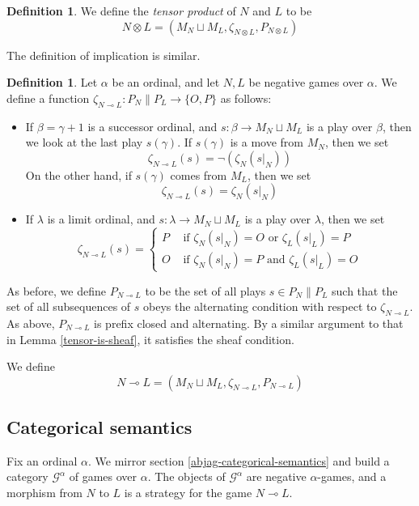 \documentclass[11pt]{article} %
\theoremstyle{plain} %
\theoremstyle{definition} %
\newtheorem{definition}[theorem]{Definition}
\theoremstyle{exercisestyle}
\newcommand*\from{\colon}
\newcommand{\cmap}[3]{#1\from{}#2\to{}#3}
\newcommand{\tensor}{\otimes}
\renewcommand{\implies}{\multimap}
\newcommand{\cprd}{\sqcup}
\newcommand{\G}{\mathcal G}
\begin{document}
\begin{definition}
  We define the \emph{tensor product} of $N$ and $L$ to be
  \[
    N\tensor L=(M_N\cprd M_L,\zeta_{N\tensor L},P_{N\tensor L})
  \]
\end{definition}

The definition of implication is similar.

\begin{definition}
  Let $\alpha$ be an ordinal, and let $N,L$ be negative games over $\alpha$.  We define a function $\cmap{\zeta_{N\implies L}}{P_N\|P_L}{\{O,P\}}$ as follows:
  \begin{itemize}
    \item If $\beta=\gamma+1$ is a successor ordinal, and $\cmap{s}{\beta}{M_N\cprd M_L}$ is a play over $\beta$, then we look at the last play $s(\gamma)$.  If $s(\gamma)$ is a move from $M_N$, then we set
      \[
        \zeta_{N\implies L}(s)=\neg(\zeta_N(s\vert_N))
      \]
      On the other hand, if $s(\gamma)$ comes from $M_L$, then we set
      \[
        \zeta_{N\implies L}(s)=\zeta_N(s\vert_N)
      \]
    \item If $\lambda$ is a limit ordinal, and $\cmap{s}{\lambda}{M_N\cprd M_L}$ is a play over $\lambda$, then we set
      \[
        \zeta_{N\implies L}(s)=
        \begin{cases}
          P&\textrm{ if $\zeta_N(s\vert_N)=O$ or $\zeta_L(s\vert_L)=P$}\\
          O&\textrm{ if $\zeta_N(s\vert_N)=P$ and $\zeta_L(s\vert_L)=O$}
        \end{cases}
      \]
  \end{itemize}
  
  As before, we define $P_{N\implies L}$ to be the set of all plays $s\in P_N\|P_L$ such that the set of all subsequences of $s$ obeys the alternating condition with respect to $\zeta_{N\implies L}$.  As above, $P_{N\implies L}$ is prefix closed and alternating.  By a similar argument to that in Lemma \ref{tensor-is-sheaf}, it satisfies the sheaf condition.

  We define
  \[
    N\implies L=(M_N\cprd M_L,\zeta_{N\implies L},P_{N\implies L})
  \]
\end{definition}

\subsection{Categorical semantics}

Fix an ordinal $\alpha$.  We mirror section \ref{abjag-categorical-semantics} and build a category $\G^\alpha$ of games over $\alpha$.  The objects of $\G^\alpha$ are negative $\alpha$-games, and a morphism from $N$ to $L$ is a strategy for the game $N\implies L$.
\end{document}
